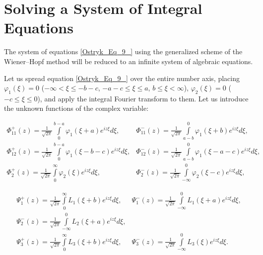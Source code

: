 \section{Solving a System of Integral Equations}

The system of equations \eqref{Ostryk_Eq_9_} using the generalized scheme \cite{Ostryk72} of the Wiener--Hopf method \cite{Ostryk73} will be reduced to an infinite system of algebraic equations.

Let us spread equation \eqref{Ostryk_Eq_9_} over the entire number axis, placing $\varphi _{1} (\xi )=0$ ($-\infty <\xi \le -b-c$, $-a-c\le \xi \le a$, $b\le \xi <\infty $), $\varphi _{2} (\xi )=0$ ($-c\le \xi \le 0$), and apply the integral Fourier transform to them. Let us introduce the unknown functions of the complex variable:

\begin{equation*}
\begin{array}{ll}
	\Phi _{11}^{+} (z)={\tfrac{1}{\sqrt{2\pi } }} \int\limits_{0}^{b-a}\varphi _{1} (\xi +a)e^{iz\xi } d\xi, & \Phi _{11}^{-} (z)={\tfrac{1}{\sqrt{2\pi } }} \int\limits _{a-b}^{0}\varphi _{1} (\xi +b)e^{iz\xi } d\xi  ,
	\\
	\Phi _{12}^{+} (z)={\tfrac{1}{\sqrt{2\pi } }} \int\limits _{0}^{b-a}\varphi _{1} (\xi -b-c)e^{iz\xi } d\xi, & \Phi _{12}^{-} (z)={\tfrac{1}{\sqrt{2\pi } }} \int\limits _{a-b}^{0}\varphi _{1} (\xi -a-c)e^{iz\xi } d\xi  ,
	\\
	\Phi _{2}^{+} (z)={\tfrac{1}{\sqrt{2\pi } }} \int\limits_{0}^{\infty }\varphi _{2} (\xi )e^{iz\xi } d\xi, & \Phi _{2}^{-} (z)={\tfrac{1}{\sqrt{2\pi } }} \int\limits _{-\infty }^{0}\varphi _{2} (\xi -c)e^{iz\xi } d\xi  ,
\end{array}
\end{equation*}

\begin{equation} \label{Ostryk_Eq_12_} 
\begin{array}{ll}
	\Psi _{1}^{+} (z)={\tfrac{1}{\sqrt{2\pi } }} \int\limits _{0}^{\infty }L_{1} (\xi +b)e^{iz\xi } d\xi  ,  &  \Psi _{1}^{-} (z)={\tfrac{1}{\sqrt{2\pi } }} \int\limits _{-\infty }^{0}L_{1} (\xi +a)e^{iz\xi } d\xi  ,
	\\
	\Psi _{2}^{-} (z)={\tfrac{1}{\sqrt{2\pi } }} \int\limits _{-\infty }^{0}L_{2} (\xi +a)e^{iz\xi } d\xi  ,  & 
	\\
	\Psi _{3}^{+} (z)={\tfrac{1}{\sqrt{2\pi } }} \int\limits _{0}^{\infty }L_{3} (\xi +b)e^{iz\xi } d\xi  , &
	\Psi _{3}^{-} (z)={\tfrac{1}{\sqrt{2\pi } }} \int\limits _{-\infty }^{0}L_{3} (\xi )e^{iz\xi } d\xi  .  
\end{array}
\end{equation} 


